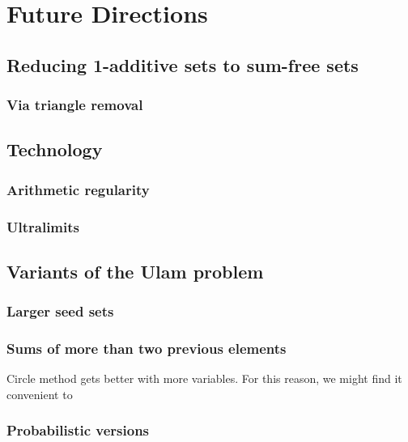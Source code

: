 \documentclass{article}
\theoremstyle{definition}
\theoremstyle{remark}
\numberwithin{equation}{section}
\begin{document}
{\color{red}

\section{Future Directions}

\subsection{Reducing 1-additive sets to sum-free sets}

\subsubsection{Via triangle removal}

\subsection{Technology}

\subsubsection{Arithmetic regularity}

\subsubsection{Ultralimits}

\subsection{Variants of the Ulam problem}
\subsubsection{Larger seed sets}
\subsubsection{Sums of more than two previous elements}

Circle method gets better with more variables.  For this reason, we
might find it convenient to 

\subsubsection{Probabilistic versions}

}

{}

\end{document}
